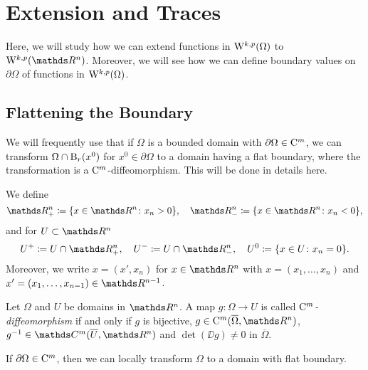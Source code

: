 \chapter{Extension and Traces}
\label{chap:extAndTrace}

Here, we will study how we can extend functions in $\mathrm{W}^{k,p}(\Omega)$ to $\WW^{k,p}(\R^n)$.
Moreover, we will see how we can define boundary values on $\partial\Omega$ of functions in $\mathrm{W}^{k,p}(\Omega)$.

\section{Flattening the Boundary}

We will frequently use that if $\Omega$ is a bounded domain with $\partial\Omega \in \mathrm{C}^m$, we can transform $\Omega \cap \mathrm{B}_r(x^0)$ for $x^0 \in \partial\Omega$ to a domain having a flat boundary, where the transformation is a $\mathrm{C}^m$\hyp{}diffeomorphism.
This will be done in details here.

\begin{ntion}
  \label{ntion:halfspace}
  We define 
  $$
  \R^n_+ \coloneqq \{x \in \R^n \colon x_n > 0 \}, \quad \R^n_-\coloneqq \{x \in \R^n \colon x_n < 0\},
  $$
  and for $U \subset \R^n$
  $$
  U^+ \coloneqq U \cap \R^n_+, \quad U^- \coloneqq U \cap \R^n_-, \quad U^0 \coloneqq \{x \in U \colon x_n = 0\}.
  $$
  Moreover, we write $x = (x', x_n)$ for $x \in \R^n$ with $x = (x_1,\dots,x_n)$ and $x' =(x_1, \dots, x_{n - 1}) \in \R^{n - 1}$.
\end{ntion}

\begin{defn}
  \label{defn:CmDiffeo}
  Let $\Omega$ and $U$ be domains in $\R^n$.
  A map $g \colon \Omega \to U$ is called \emph{$\mathrm{C}^m$\hyp{}diffeomorphism} if and only if $g$ is bijective, $g \in \CC^m(\overline{\Omega},\R^n)$, $g^{-1} \in \C^m(\overline U, \R^n)$ and $\det(\DD g) \neq 0$ in $\overline \Omega$.
\end{defn}

If $\partial \Omega \in \mathrm{C}^m$, then we can locally transform $\Omega$ to a domain with flat boundary.

